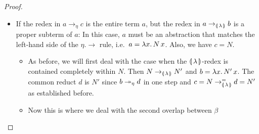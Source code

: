 \begin{proof}
\begin{itemize}
\begin{itemize}
\begin{itemize}
        $a = \ap{(\lam{x}{\ap{T}{x}})}{N}$. Performing the $\eta$-reduction
        yields $c = \ap{T}{N}$. In this case, both $b$ and $c$ are equal to
        $\ap{T}{N}$ and so we can choose $\ap{T}{N}$ as our $d$.
      \end{itemize}
    \item If $a$ is any other kind of term: Let $l \to r$ be the rule used
      in $a \to_{\calc} b$. Not counting $\beta.\to$, which only acts on
      applications and which we dealt with just above, the rules of
      $\banana{\lambda}$ do not overlap with the $\eta.\to$ rule. This
      means the $\eta$-redex which led to $c$ must lie entirely inside a
      part the part of $l$ which corresponds to a metavariable. Let $M$ be
      that metavariable, then we will decompose $l$ into $L(M)$ and $r$
      into $R(M)$. We have $a = L(a')$ for some $a'$, $b = R(a')$ and
      $c = L(a'')$\footnote{Since our rules are left-linear, $M$ is
        guaranteed to appear in $L(M)$ at most once. Therefore, if
        $a' \to_\eta a''$ in one step, then also $L(a') \to_\eta L(a'')$ in
        one step as well.}. Our $d$ will be $R(a'')$ and we have
      $b = R(a') \tto_\eta d = R(a'')$ in several steps\footnote{$a'$ can
        occur multiple times in $R(a')$ when the rule $l \to r$ is
        duplicating (which is actually the case for the $\banana{\op{op}}$
        rules). However, we are able to go from $R(a')$ to $R(a'')$ in
        multiple steps. NB: This is why we use
        Lemma~\ref{lem:commutativity} instead of trying to prove
        commutativity directly.} and $c = L(a'') \to_{\calc}^= d = R(a'')$
      in one step of $l \to r$.
    \end{itemize}
  \item If the redex in $a \to_\eta c$ is the entire term $a$, but the
    redex in $a \to_{\calc} b$ is a proper subterm of $a$: In this case,
    $a$ must be an abstraction that matches the left-hand side of the
    $\eta.\to$ rule, i.e.\ $a = \lambda x.\, N\,x$. Also, we have $c = N$.
    \begin{itemize}
    \item As before, we will first deal with the case when the
      $\banana{\lambda}$-redex is contained completely within $N$. Then
      $N \to_{\llparenthesis \, \lambda \, \rrparenthesis} N'$ and $b = \lambda x.\, N'\,x$. The common reduct
      $d$ is $N'$ since $b \twoheadrightarrow_\eta d$ in one step and
      $c = N \to_{\llparenthesis \, \lambda \, \rrparenthesis}^= d = N'$ as established before.
    \item Now this is where we deal with the second overlap between $\beta$

\end{itemize}
\end{itemize}
\end{proof}
